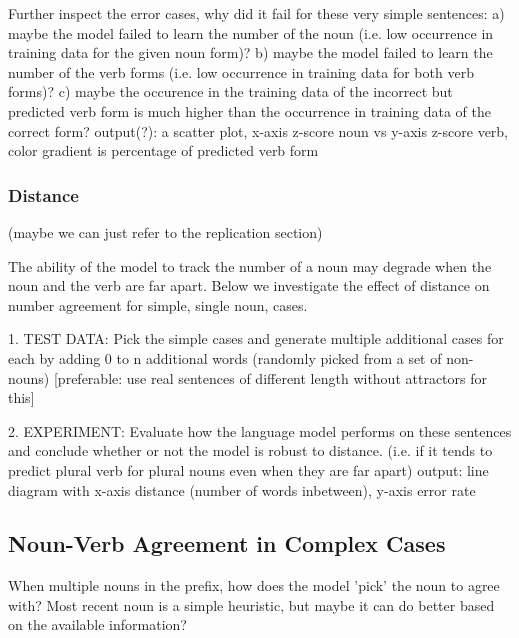 Further inspect the error cases, why did it fail for these very simple sentences:
a) maybe the model failed to learn the number of the noun (i.e. low occurrence in training data for the given noun form)?
b) maybe the model failed to learn the number of the verb forms (i.e. low occurrence in training data for both verb forms)?
c) maybe the occurence in the training data of the incorrect but predicted verb form is much higher than the occurrence 
in training data of the correct form?
output(?): a scatter plot, x-axis z-score noun vs y-axis z-score verb, color gradient is percentage of predicted verb form

\subsubsection{Distance}

(maybe we can just refer to the replication section)

The ability of the model to track the number of a noun may degrade
when the noun and the verb are far apart.
Below we investigate the effect of distance on number agreement for simple,
single noun, cases.

1. TEST DATA:
Pick the simple cases and generate multiple additional cases for each by adding 0 to n additional words (randomly picked from a set of non-nouns)
[preferable: use real sentences of different length without attractors for this]

2. EXPERIMENT:
Evaluate how the language model performs on these sentences 
and conclude whether or not the model is robust to distance. 
(i.e. if it tends to predict plural verb for plural nouns even when they are far apart)
output: line diagram with x-axis distance (number of words inbetween), y-axis error rate
 
\subsection{Noun-Verb Agreement in Complex Cases}

When multiple nouns in the prefix, how does the model 'pick' the noun to agree with?
Most recent noun is a simple heuristic, but maybe it can do better based
on the available information?

